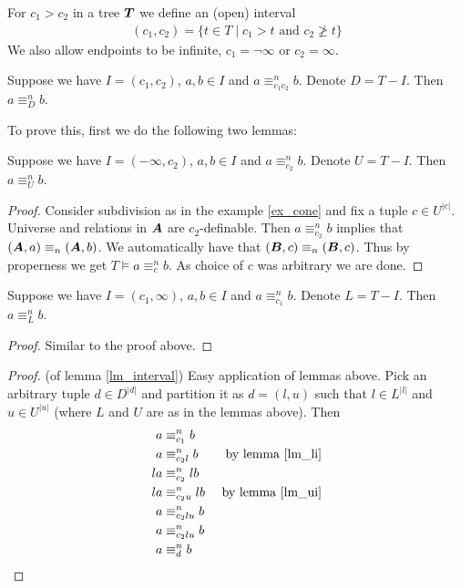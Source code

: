 \documentclass{amsart}
\DeclareMathOperator{\TT}{\boldface T}
\DeclareMathOperator{\A}{\boldface A}
\DeclareMathOperator{\B}{\boldface B}
\begin{document}
\begin{Definition}
	For $c_1 > c_2$ in a tree $\TT$ we define an (open) interval
	\begin{align*}
		(c_1, c_2) = \{t \in T \mid c_1 > t \text{ and } c_2 \ngeq t\}
	\end{align*}
	We also allow endpoints to be infinite, $c_1 = \neg \infty$ or $c_2 = \infty$.
\end{Definition}

\begin{Lemma} \label{lm_interval}
	Suppose we have $I = (c_1, c_2)$, $a,b \in I$ and $a \equiv^n_{c_1c_2} b$. Denote $D = T - I$. Then $a \equiv^n_D b$.
\end{Lemma}

To prove this, first we do the following two lemmas:

\begin{Lemma}
	Suppose we have $I = (-\infty, c_2)$, $a,b \in I$ and $a \equiv^n_{c_2} b$. Denote $U = T - I$. Then $a \equiv^n_U b$.
\end{Lemma}

\begin{proof} \label{lm_ui}
	Consider subdivision as in the example \ref{ex_cone} and fix a tuple $c \in U^{|c|}$. Universe and relations in $\A$ are $c_2$-definable. Then $a \equiv^n_{c_2} b$ implies that $(\A, a) \equiv_n (\A, b)$. We automatically have that $(\B, c) \equiv_n (\B, c)$. Thus by properness we get $T \models a \equiv^n_c b$. As choice of $c$ was arbitrary we are done.
\end{proof}

\begin{Lemma} \label{lm_li}
	Suppose we have $I = (c_1, \infty)$, $a,b \in I$ and $a \equiv^n_{c_1} b$. Denote $L = T - I$. Then $a \equiv^n_L b$.
\end{Lemma}
\begin{proof}
	Similar to the proof above.
\end{proof}

\begin{proof} (of lemma \ref{lm_interval})
	Easy application of lemmas above. Pick an arbitrary tuple $d \in D^{|d|}$ and partition it as $d = (l, u)$ such that $l \in L^{|l|}$ and $u \in U^{|u|}$ (where $L$ and $U$ are as in the lemmas above). Then 
	\begin{align*}
		a &\equiv^n_{c_1} b \\
		a &\equiv^n_{c_2l} b 		&\text{ by lemma \ref{lm_li}}\\
		la &\equiv^n_{c_2} lb \\
		la &\equiv^n_{c_2u} lb  &\text{ by lemma \ref{lm_ui}}\\
		a &\equiv^n_{c_2lu} b \\
		a &\equiv^n_{c_2lu} b \\
		a &\equiv^n_{d} b
	\end{align*}
\end{proof}
\end{document}
